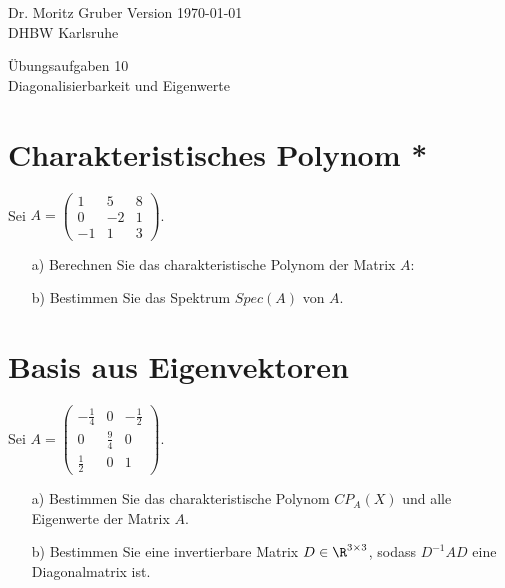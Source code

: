 




\vspace*{-20mm}
{
	\color{dhbwGray}
	Dr. Moritz Gruber	\hfill Version \today\\
	DHBW Karlsruhe\\
}

\vspace{10mm}
\begin{center}
	{
		\color{lightBlue}
		{ \LARGE 	Übungsaufgaben 10}\\[3mm]
		{\Large Diagonalisierbarkeit und Eigenwerte}
	}
\end{center}

\vspace{5mm}

\section{Charakteristisches Polynom *}
Sei $A=	\begin{pmatrix}
		1	&5	&8	\\
		0	&-2	&1	\\
		-1	&1	&3
	\end{pmatrix}$. 
\begin{itemize}
\item[a)] Berechnen Sie das charakteristische Polynom der Matrix $A$:
\item[b)] Bestimmen Sie das Spektrum $Spec(A)$ von $A$.
\end{itemize}

\section{Basis aus Eigenvektoren}
Sei $A=\begin{pmatrix} -\frac{1}{4} & 0 & -\frac{1}{2} \\ 0 & \frac{9}{4} & 0 \\ \frac{1}{2} & 0 &1 \end{pmatrix}$. 
\begin{itemize}
\item[a)] Bestimmen Sie das charakteristische Polynom $CP_A(X)$ und alle Eigenwerte der Matrix $A$.
\item[b)] Bestimmen Sie eine invertierbare Matrix $D \in \R^{3 \times 3}$, sodass $D^{-1}AD$ eine Diagonalmatrix ist.
\end{itemize}

